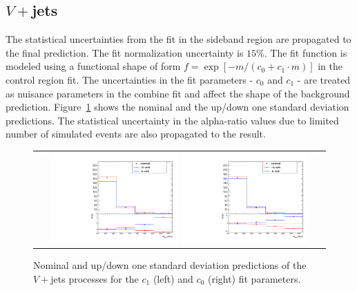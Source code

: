\subsection{$V+$jets}
The statistical uncertainties from the fit in the sideband region are propagated to the final prediction. The fit normalization uncertainty is $15\%$. The fit function is modeled using a functional shape of form $f=\exp\left[-m/(c_{0}+c_1\cdot m)\right]$ in the control region fit. The uncertainties in the fit parameters - $c_{0}$ and $c_{1}$ - are treated as nuisance parameters in the combine fit and affect the shape of the background prediction. Figure~\ref{fig:wjet} shows the nominal and the up/down one standard deviation predictions. The statistical uncertainty in the alpha-ratio values due to limited number of simulated events are also propagated to the result. 
%
\begin{figure}[!htbp]
  \begin{center}
    \begin{tabular}{c}
    \includegraphics[width=0.45\textwidth]{Plots/systematic/WjetFitSyst_Par0_Wjets.pdf}%
    \includegraphics[width=0.45\textwidth]{Plots/systematic/WjetFitSyst_Par1_Wjets.pdf}%
    \end{tabular}
    \caption{Nominal and up/down one standard deviation predictions of the $V+$jets processes for the $c_{1}$ (left) and $c_{0}$ (right) fit parameters.}
    \label{fig:wjet}
  \end{center}
\end{figure}

